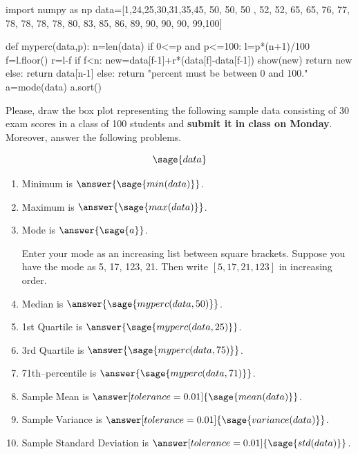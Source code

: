 \documentclass{ximera}
\begin{document}
\begin{problem}
\begin{sagesilent}
import numpy as np
data=[1,24,25,30,31,35,45, 50, 50, 50 , 52, 52, 65, 65, 76, 77, 78, 78, 78, 78, 80, 83, 85, 86, 89, 90, 90, 90, 99,100]

def myperc(data,p):
    n=len(data)
    if 0<=p and p<=100:
        l=p*(n+1)/100
        f=l.floor()
        r=l-f
        if f<n:
            new=data[f-1]+r*(data[f]-data[f-1])
            show(new)
            return new
        else:
            return data[n-1]
    else:
        return "percent must be between 0 and 100."
a=mode(data)
a.sort()
\end{sagesilent}
Please, draw the box plot representing the following sample data consisting of 30 exam scores in a class of 100 students and \textbf{submit it in class on Monday}. Moreover, answer the following problems.

$$\sage{data}$$

\begin{enumerate}
    \item Minimum is $\answer{\sage{min(data)}}$.
    \item Maximum is $\answer{\sage{max(data)}}$.
    \item Mode is $\answer{\sage{a}}$.
            \begin{hint}
        Enter your mode as an increasing list between square brackets. 
        Suppose you have the mode as 5, 17, 123, 21. Then write $[5, 17,21, 123]$ in increasing order.
        \end{hint}

    \item Median is $\answer{\sage{myperc(data,50)}}$.
    \item 1st Quartile is $\answer{\sage{myperc(data,25)}}$.
    \item 3rd Quartile is $\answer{\sage{myperc(data,75)}}$.
    \item 71th--percentile is $\answer{\sage{myperc(data,71)}}$.
    \item Sample Mean is $\answer[tolerance=0.01]{\sage{mean(data)}}$.
    \item Sample Variance is $\answer[tolerance=0.01]{\sage{variance(data)}}$.
    \item Sample Standard Deviation is $\answer[tolerance=0.01]{\sage{std(data)}}$.
\end{enumerate}
\end{problem}
\end{document}
